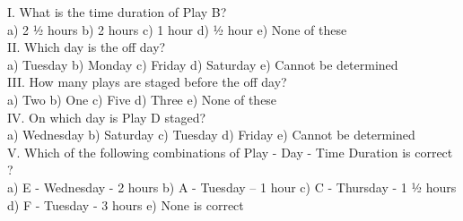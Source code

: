 \documentclass[
]{article}
\begin{document}
I. What is the time duration of Play B?\\
a) 2 1⁄2 hours \hspace{2mm}b) 2 hours \hspace{2mm}c) 1 hour
\hspace{2mm}d) 1⁄2 hour \hspace{2mm}e) None of these\\

II. Which day is the off day?\\
a) Tuesday \hspace{2mm}b) Monday \hspace{2mm}c) Friday
\hspace{2mm}d) Saturday \hspace{2mm}e) Cannot be determined\\

III. How many plays are staged before the off day?\\
a) Two \hspace{2mm}b) One \hspace{2mm}c) Five \hspace{2mm}d) Three \hspace{2mm}e) None of these\\

IV. On which day is Play D staged?\\
a) Wednesday \hspace{2mm}b) Saturday \hspace{2mm}c) Tuesday
\hspace{2mm}d) Friday \hspace{2mm}e) Cannot be determined\\

V. Which of the following combinations of Play - Day - Time Duration is correct ?\\
a) E - Wednesday - 2 hours \hspace{2mm}b) A - Tuesday – 1 hour
\hspace{2mm}c) C - Thursday - 1 1⁄2 hours \hspace{2mm}d) F - Tuesday - 3 hours
\hspace{2mm}e) None is correct\\
\end{document}

